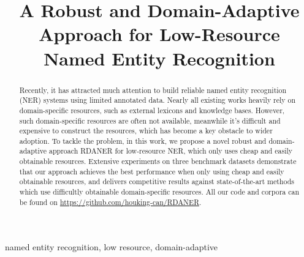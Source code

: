 \documentclass[10pt, conference, compsocconf]{IEEEtran}
\newcommand{\rdaner}{\textsc{RDANER}\xspace}
\begin{document}
\title{A Robust and Domain-Adaptive Approach for Low-Resource Named Entity Recognition}


\author{
}



\maketitle

\begin{abstract}
    Recently, it has attracted much attention to build reliable named entity recognition (NER)
    systems using limited annotated data.
    Nearly all existing works heavily rely on domain-specific resources, such as external lexicons and knowledge bases. 
    However, such domain-specific resources are often not available,
    meanwhile it's difficult and expensive to construct the resources, 
    which has become a key obstacle to wider adoption.
    To tackle the problem, in this work, we propose a novel robust and domain-adaptive approach \rdaner 
    for low-resource NER, which only uses cheap and easily obtainable resources. 
    Extensive experiments on three benchmark datasets demonstrate that
    our approach achieves the best performance when
only using cheap and easily obtainable resources, and delivers competitive results
against state-of-the-art methods which use difficultly obtainable domain-specific resources.
All our code and corpora can be found on \url{https://github.com/houking-can/RDANER}.

\end{abstract}

\begin{IEEEkeywords}
    named entity recognition, low resource, domain-adaptive
\end{IEEEkeywords}
\end{document}
